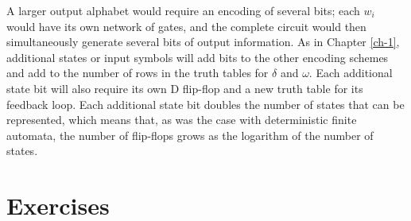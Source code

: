 A larger output alphabet would require an encoding of several bits; each $w_i$
would have its own network of gates, and the complete circuit would then
simultaneously generate several bits of output information. As in Chapter \ref{ch-1},
additional states or input symbols will add bits to the other encoding schemes
and add to the number of rows in the truth tables for $\delta$ and $\omega$.
Each additional state bit will also require its own D flip-flop and a new truth
table for its feedback loop. Each additional state bit doubles the number of
states that can be represented, which means that, as was the case with
deterministic finite automata, the number of flip-flops grows as the logarithm
of the number of states.

\section*{Exercises}
